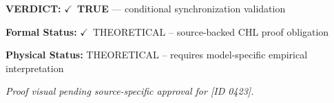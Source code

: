 \textbf{VERDICT:} \ensuremath{\checkmark}\ \textbf{TRUE} --- conditional synchronization validation

\textbf{Formal Status:} \ensuremath{\checkmark}\ THEORETICAL -- source-backed CHL proof obligation

\textbf{Physical Status:} THEORETICAL -- requires model-specific empirical interpretation
\par\vspace{0.45em}
\par
\vfill
\begingroup\footnotesize\itshape
Proof visual pending source-specific approval for [ID 0423].
\par\endgroup
\vfill
\endgroup
\endgroup
